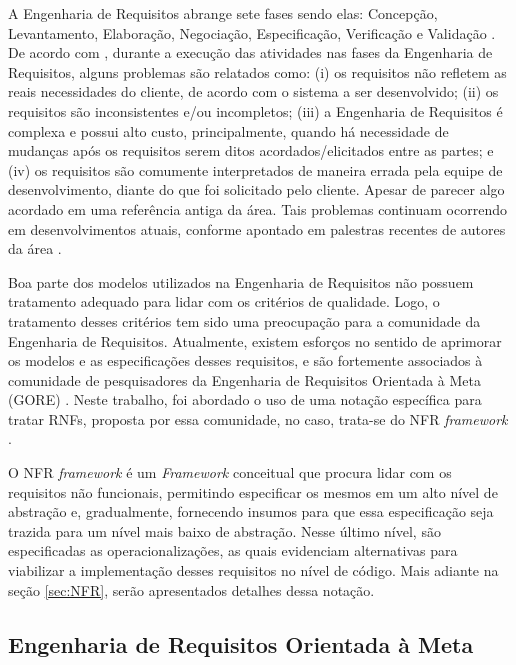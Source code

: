 A Engenharia de Requisitos abrange sete fases sendo elas: Concepção, Levantamento, Elaboração, Negociação, Especificação, Verificação e Validação \cite{pressman2011engenharia}. De acordo com \cite{kotonya1998requirements}, durante a execução das atividades nas fases da Engenharia de Requisitos, alguns problemas são relatados como: (i) os requisitos não refletem as reais necessidades do cliente, de acordo com o sistema a ser desenvolvido; (ii) os requisitos são inconsistentes e/ou incompletos; (iii) a Engenharia de Requisitos é complexa e possui alto custo, principalmente, quando há necessidade de mudanças após os requisitos serem ditos acordados/elicitados entre as partes; e (iv) os requisitos são comumente interpretados de maneira errada pela equipe de desenvolvimento, diante do que foi solicitado pelo cliente. Apesar de parecer algo acordado em uma referência antiga da área. Tais problemas continuam ocorrendo em desenvolvimentos atuais, conforme apontado em palestras recentes de autores da área \cite{palestrasilvio}. 

Boa parte dos modelos utilizados na Engenharia de Requisitos não possuem tratamento adequado para lidar com os critérios de qualidade. Logo, o tratamento desses critérios tem sido uma preocupação para a comunidade da Engenharia de Requisitos. Atualmente, existem esforços no sentido de aprimorar os modelos e as especificações desses requisitos, e são fortemente associados à comunidade de pesquisadores da Engenharia de Requisitos Orientada à Meta (GORE) \cite{chung2012non}. Neste trabalho, foi abordado o uso de uma notação específica para tratar RNFs, proposta por essa comunidade, no caso, trata-se do NFR \textit{framework} \cite{chung2012non}. 

O NFR \textit{framework} é um \textit{Framework} conceitual que procura lidar com os requisitos não funcionais, permitindo especificar os mesmos em um alto nível de abstração e, gradualmente, fornecendo insumos para que essa especificação seja trazida para um nível mais baixo de abstração. Nesse último nível, são especificadas as operacionalizações, as quais evidenciam alternativas para viabilizar a implementação desses requisitos no nível de código. Mais adiante na seção \ref{sec:NFR}, serão apresentados detalhes dessa notação.

\subsection{Engenharia de Requisitos Orientada à Meta}
\label{subsec:orientacaoMeta}

